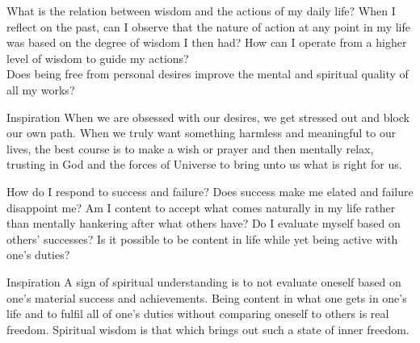 
\newpage
\begin{mananam}{} 
\mananamtext What is the relation between wisdom and the actions of my daily life? When I reflect on the past, can I observe that the nature of action at any point in my life was based on the degree of wisdom I then had? How can I operate from a higher level of wisdom to guide my actions?\\
Does being free from personal desires improve the mental and spiritual quality of all my works?
\end{mananam}
\WritingHand{}
\begin{inspiration}{\mananamfont Inspiration}
\mananamtext When we are obsessed with our desires, we get stressed out and block our own path. When we truly want something harmless and meaningful to our lives, the best course is to make a wish or prayer and then mentally relax, trusting in God and the forces of Universe to bring unto us what is right for us.
\end{inspiration}
\newpage


\newpage
\begin{mananam}{} 
\mananamtext How do I respond to success and failure? Does success make me elated and failure disappoint me? Am I content to accept what comes naturally in my life rather than mentally hankering after what others have? Do I evaluate myself based on others’ successes? Is it possible to be content in life while yet being active with one’s duties?
\end{mananam}
\WritingHand{}
\begin{inspiration}{\mananamfont Inspiration}
\mananamtext A sign of spiritual understanding is to not evaluate oneself based on one’s material success and achievements. Being content in what one gets in one’s life and to fulfil all of one’s duties without comparing oneself to others is real freedom. Spiritual wisdom is that which brings out such a state of inner freedom.
\end{inspiration}
\newpage

